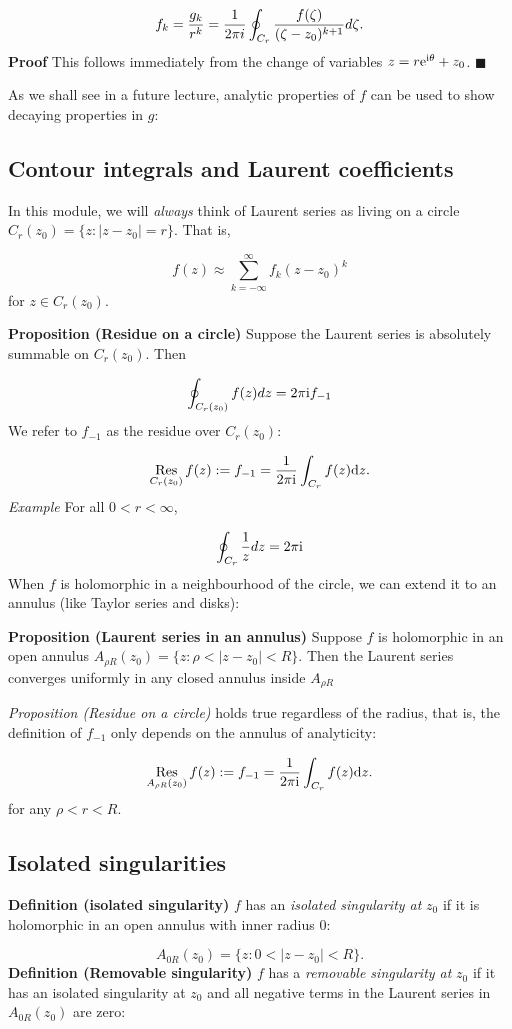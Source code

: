 \documentclass[12pt,landscape]{article}
\def\D{ {\rm d} }
\def\I{ {\rm i} }
\def\E{ {\rm e} }
\def\Res_#1{\underset{#1}{\rm Res}\,}
\begin{document}
{\[
f_k = {g_k \over r^k} = {1 \over 2 \pi i} \oint_{C_r} {f(\zeta) \over (\zeta - z_0)^{k+1}} d \zeta.
\]
\textbf{Proof}  This follows immediately from the change of variables $z = r \E^{\I \theta} + z_0$. \ensuremath{\blacksquare}

As we shall see in a future lecture, analytic properties of $f$ can be used to show decaying properties in $g$:
\newpage
\subsection{Contour integrals and Laurent coefficients}
In this module, we will \emph{always} think of Laurent series as living on a circle $C_r(z_0) = \{z : |z-z_0| = r \}$. That is,

\[
    f(z) \approx \sum_{k=-\infty}^\infty f_k (z-z_0)^k
\]
for $z \in C_r(z_0)$.

\textbf{Proposition (Residue on a circle)} Suppose the Laurent series is absolutely summable on $C_r(z_0)$. Then

\[
\oint_{C_r(z_0)} f(z) dz = 2 \pi \I f_{-1}
\]
We refer to $f_{-1}$ as the residue over $C_r(z_0)$:

\[
\Res_{C_r(z_0)} f(z) := f_{-1} = {1 \over 2 \pi \I} \int_{C_r} f(z) \D z.
\]
\emph{Example} For all $0 < r < \infty$,

\[
\oint_{C_r} {1 \over z} dz = 2 \pi \I
\]
\newpage
When $f$ is holomorphic in a neighbourhood of the circle, we can extend it to an annulus (like Taylor series and disks):

\textbf{Proposition (Laurent series in an annulus)} Suppose $f$ is holomorphic in an open annulus $A_{\rho R}(z_0) = \{z : \rho  < | z - z_0| < R\}$. Then the Laurent series converges uniformly in  any closed annulus inside $A_{\rho R}$

\emph{Proposition (Residue on a circle)} holds true regardless of the radius, that is, the definition of $f_{-1}$ only depends on the annulus of analyticity:

\[
\Res_{A_{\rho R}(z_0)} f(z) := f_{-1} = {1 \over 2 \pi \I} \int_{C_r} f(z) \D z.
\]
for any $\rho < r < R$.
\newpage
\subsection{Isolated singularities}
\textbf{Definition (isolated singularity)} $f$ has an  \emph{isolated singularity at} $z_0$ if it is holomorphic in an open annulus with inner radius 0:

\[
A_{0R}(z_0) = \{z : 0 < |z - z_0| < R \}.
\]
\textbf{Definition (Removable singularity)} $f$ has a \emph{removable singularity at} $z_0$ if it has an isolated singularity at $z_0$ and all negative terms in the Laurent series in $A_{0R}(z_0)$ are zero:

}
\end{document}
